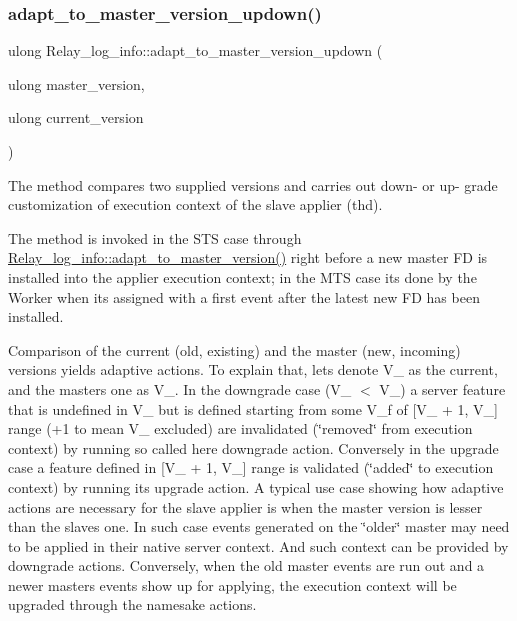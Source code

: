 \subsubsection{\texorpdfstring{adapt\+\_\+to\+\_\+master\+\_\+version\+\_\+updown()}{adapt\_to\_master\_version\_updown()}}
{\footnotesize\ttfamily ulong Relay\+\_\+log\+\_\+info\+::adapt\+\_\+to\+\_\+master\+\_\+version\+\_\+updown (\begin{DoxyParamCaption}\item[{ulong}]{master\+\_\+version,  }\item[{ulong}]{current\+\_\+version }\end{DoxyParamCaption})}

The method compares two supplied versions and carries out down-\/ or up-\/ grade customization of execution context of the slave applier (thd).

The method is invoked in the S\+TS case through \mbox{\hyperlink{classRelay__log__info_a882c4b69a10aec9768aac5a01fad52d7}{Relay\+\_\+log\+\_\+info\+::adapt\+\_\+to\+\_\+master\+\_\+version()}} right before a new master FD is installed into the applier execution context; in the M\+TS case it\textquotesingle{}s done by the Worker when it\textquotesingle{}s assigned with a first event after the latest new FD has been installed.

Comparison of the current (old, existing) and the master (new, incoming) versions yields adaptive actions. To explain that, let\textquotesingle{}s denote V\+\_ as the current, and the master\textquotesingle{}s one as V\+\_. In the downgrade case (V\+\_ $<$ V\+\_) a server feature that is undefined in V\+\_ but is defined starting from some V\+\_\+f of \mbox{[}V\+\_ + 1, V\+\_\mbox{]} range (+1 to mean V\+\_ excluded) are invalidated (\char`\"{}removed\char`\"{} from execution context) by running so called here downgrade action. Conversely in the upgrade case a feature defined in \mbox{[}V\+\_ + 1, V\+\_\mbox{]} range is validated (\char`\"{}added\char`\"{} to execution context) by running its upgrade action. A typical use case showing how adaptive actions are necessary for the slave applier is when the master version is lesser than the slave\textquotesingle{}s one. In such case events generated on the \char`\"{}older\char`\"{} master may need to be applied in their native server context. And such context can be provided by downgrade actions. Conversely, when the old master events are run out and a newer master\textquotesingle{}s events show up for applying, the execution context will be upgraded through the namesake actions.

